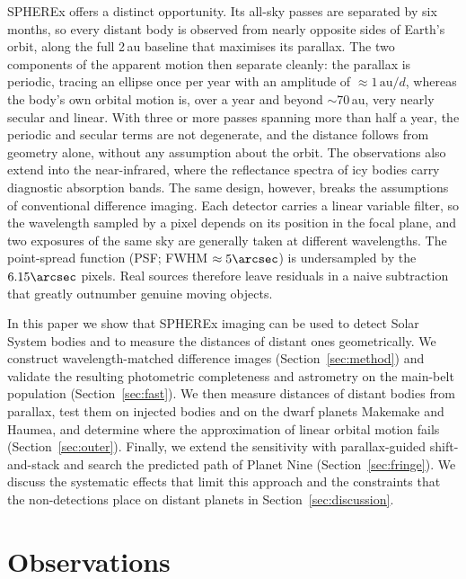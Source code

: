 \documentclass[twocolumn,linenumbers]{aastex702}
\begin{document}
SPHEREx \citep{dore14,korngut18,crill20,bock26} offers a distinct opportunity. Its all-sky passes are separated by six months, so every distant body is observed from nearly opposite sides of Earth's orbit, along the full 2\,au baseline that maximises its parallax. The two components of the apparent motion then separate cleanly: the parallax is periodic, tracing an ellipse once per year with an amplitude of $\approx 1\,\mathrm{au}/d$, whereas the body's own orbital motion is, over a year and beyond $\sim$70\,au, very nearly secular and linear. With three or more passes spanning more than half a year, the periodic and secular terms are not degenerate, and the distance follows from geometry alone, without any assumption about the orbit. The observations also extend into the near-infrared, where the reflectance spectra of icy bodies carry diagnostic absorption bands. The same design, however, breaks the assumptions of conventional difference imaging. Each detector carries a linear variable filter, so the wavelength sampled by a pixel depends on its position in the focal plane, and two exposures of the same sky are generally taken at different wavelengths. The point-spread function (PSF; FWHM $\approx 5\arcsec$) is undersampled by the $6.15\arcsec$ pixels. Real sources therefore leave residuals in a naive subtraction that greatly outnumber genuine moving objects.

In this paper we show that SPHEREx imaging can be used to detect Solar System bodies and to measure the distances of distant ones geometrically. We construct wavelength-matched difference images (Section~\ref{sec:method}) and validate the resulting photometric completeness and astrometry on the main-belt population (Section~\ref{sec:fast}). We then measure distances of distant bodies from parallax, test them on injected bodies and on the dwarf planets Makemake and Haumea, and determine where the approximation of linear orbital motion fails (Section~\ref{sec:outer}). Finally, we extend the sensitivity with parallax-guided shift-and-stack and search the predicted path of Planet Nine (Section~\ref{sec:fringe}). We discuss the systematic effects that limit this approach and the constraints that the non-detections place on distant planets in Section~\ref{sec:discussion}.

\section{Observations}\label{sec:data}
\end{document}
